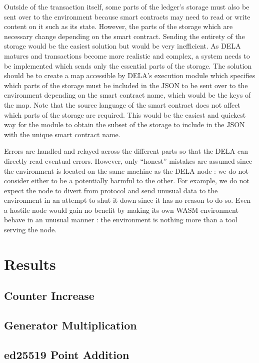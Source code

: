 \documentclass[11pt, a4paper, twoside, openright]{article}
\begin{document}
Outside of the transaction itself, some parts of the ledger's storage must also be sent over to the environment because smart contracts may need to read or write content on it such as its state. However, the parts of the storage which are necessary change depending on the smart contract. Sending the entirety of the storage would be the easiest solution but would be very inefficient. As DELA matures and transactions become more realistic and complex, a system needs to be implemented which sends only the essential parts of the storage. The solution should be to create a map accessible by DELA's execution module which specifies which parts of the storage must be included in the JSON to be sent over to the environment depending on the smart contract name, which would be the keys of the map. Note that the source language of the smart contract does not affect which parts of the storage are required. This would be the easiest and quickest way for the module to obtain the subset of the storage to include in the JSON with the unique smart contract name.

Errors are handled and relayed across the different parts so that the DELA can directly read eventual errors. However, only ``honest'' mistakes are assumed since the environment is located on the same machine as the DELA node : we do not consider either to be a potentially harmful to the other. For example, we do not expect the node to divert from protocol and send unusual data to the environment in an attempt to shut it down since it has no reason to do so. Even a hostile node would gain no benefit by making its own WASM environment behave in an unusual manner : the environment is nothing more than a tool serving the node.

\section{Results}

\subsection{Counter Increase}

\subsection{Generator Multiplication}

\subsection{ed25519 Point Addition}
\end{document}
